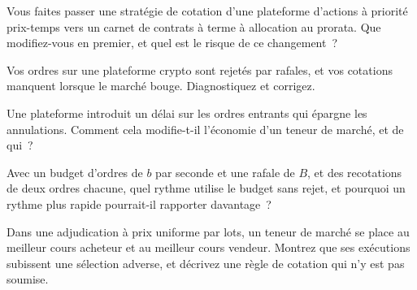 \begin{interviewq}\label{iq:hf:a-venue-playbook:2}
Vous faites passer une stratégie de cotation d'une plateforme d'actions à priorité prix-temps vers un carnet de contrats à terme à allocation au prorata. Que modifiez-vous en premier, et quel est le risque de
ce changement~?
\end{interviewq}

\begin{interviewq}\label{iq:hf:a-venue-playbook:3}
Vos ordres sur une plateforme crypto sont rejetés par rafales, et vos cotations manquent lorsque le marché bouge. Diagnostiquez et corrigez.
\end{interviewq}

\begin{interviewq}\label{iq:hf:a-venue-playbook:4}
Une plateforme introduit un délai sur les ordres entrants qui épargne les annulations. Comment cela modifie-t-il l'économie d'un teneur de marché, et de qui~?
\end{interviewq}

\begin{interviewq}\label{iq:hf:a-venue-playbook:5}
Avec un budget d'ordres de $b$ par seconde et une rafale de $B$, et des recotations de deux ordres chacune, quel rythme utilise le budget sans rejet, et pourquoi
un rythme plus rapide pourrait-il rapporter davantage~?
\end{interviewq}

\begin{interviewq}\label{iq:hf:a-venue-playbook:6}
Dans une adjudication à prix uniforme par lots, un teneur de marché se place au meilleur cours acheteur et au meilleur cours vendeur. Montrez que ses exécutions subissent une sélection adverse, et décrivez une règle de cotation
qui n'y est pas soumise.
\end{interviewq}
